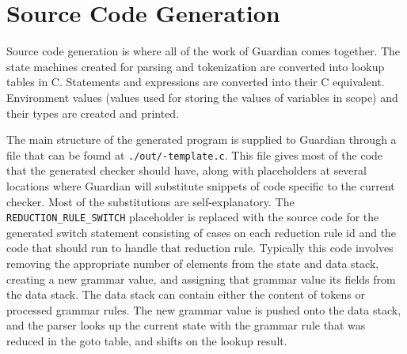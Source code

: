 
\section{Source Code Generation}
{
	Source code generation is where all of the work of Guardian comes together.
	The state machines created for parsing and tokenization
	are converted into lookup tables
	in C. Statements and expressions are converted into their C equivalent.
	Environment values (values used for storing the values of variables
	in scope) and their types are created and printed.
	
	The main structure of the generated program is supplied to Guardian
	through a file that can be found at \texttt{./out/-template.c}.
	This file gives most of the code that the
	generated checker should have, along with placeholders
	at several locations where Guardian will
	substitute snippets of code specific
	to the current checker.
	Most of the substitutions are self-explanatory.
	The \texttt{REDUCTION\_RULE\_SWITCH} placeholder is replaced
	with the source code for the generated switch statement
	consisting of cases on each reduction rule id and the code that
	should run to handle that reduction rule.
	Typically this code involves removing
	the appropriate number of
	elements from the state and data stack,
	creating a new grammar value,
	and assigning that grammar value its fields from
	the data stack. The data stack can
	contain either the content
	of tokens or processed grammar rules.
	The new grammar value is pushed onto the data stack, and
	the parser looks up the current state with the grammar rule that was reduced
	in the goto table, and shifts on the lookup result.
}



















